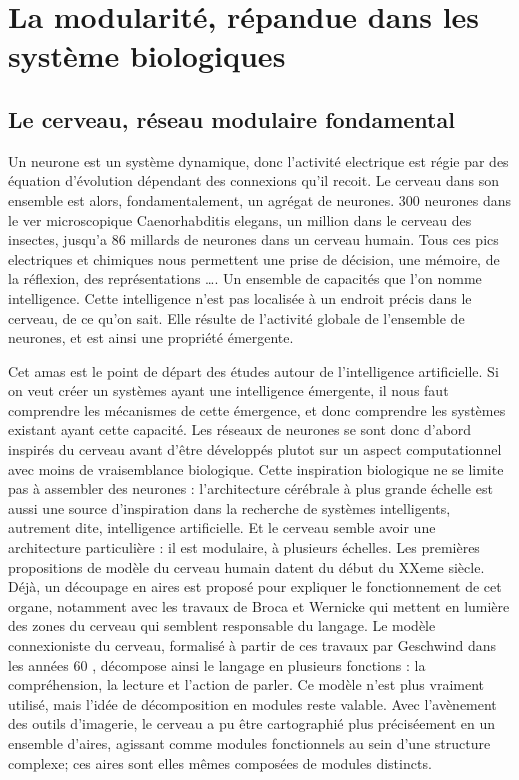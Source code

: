 
\section{La modularité, répandue dans les système biologiques}

\subsection{Le cerveau, réseau modulaire fondamental}

Un neurone est un système dynamique, donc l’activité electrique est régie par des équation d’évolution dépendant des connexions qu’il recoit. Le cerveau dans son ensemble est alors,  fondamentalement, un agrégat de neurones. 300 neurones dans le ver microscopique  Caenorhabditis elegans, un million dans le cerveau des insectes, jusqu’a 86 millards de neurones dans un cerveau humain. Tous ces pics electriques et chimiques nous permettent une prise de décision, une mémoire, de la réflexion, des représentations …. Un ensemble de capacités que l’on nomme intelligence. Cette intelligence n’est pas localisée à un endroit précis dans le cerveau, de ce qu’on sait. Elle résulte de l’activité globale de l’ensemble de neurones, et est ainsi une propriété émergente. 

Cet amas est le point de départ des études autour de l’intelligence artificielle. Si on veut créer un systèmes ayant une intelligence émergente, il nous faut comprendre les mécanismes de cette émergence, et donc comprendre les systèmes existant ayant cette capacité. Les réseaux de neurones se sont donc d’abord inspirés du cerveau avant d’être développés plutot sur un aspect computationnel avec moins de vraisemblance biologique.
Cette inspiration biologique ne se limite pas à assembler des neurones : l’architecture cérébrale à plus grande échelle est aussi une source d’inspiration dans la recherche de systèmes intelligents, autrement dite, intelligence artificielle.  
Et le cerveau semble avoir une architecture particulière : il est modulaire, à plusieurs échelles. 
Les premières propositions de modèle du cerveau humain datent du début du XXeme siècle. Déjà, un découpage en aires est proposé pour expliquer le fonctionnement de cet organe, notamment avec les travaux de Broca et Wernicke qui mettent en lumière des zones du cerveau qui semblent responsable du langage. Le modèle connexioniste du cerveau, formalisé à partir de ces travaux par Geschwind dans les années 60 , décompose ainsi le langage en plusieurs fonctions : la compréhension, la lecture et l'action de parler. Ce modèle n'est plus vraiment utilisé, mais l'idée de décomposition en modules reste valable.
Avec l'avènement des outils d'imagerie, le cerveau a pu être cartographié plus préciséement en un ensemble d'aires, agissant comme modules fonctionnels au sein d'une structure complexe; ces aires sont elles mêmes composées de modules distincts. 

